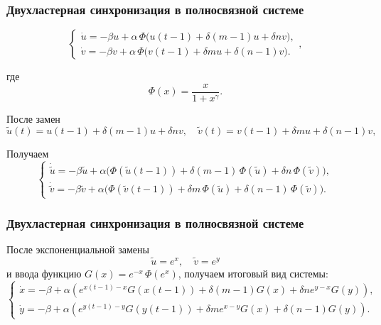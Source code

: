 \begin{frame}
	\frametitle{Двухластерная синхронизация в полносвязной системе}
	
	\begin{equation}
		\label{eq:mg_cluster_system_norm}
		\begin{cases}
			\dot{u} = -\beta u + \alpha \, \Phi \big(u(t - 1) + \delta (m - 1) u + \delta n v\big),\\
			\dot{v} = -\beta v + \alpha  \, \Phi \big(v(t - 1) + \delta m u + \delta (n - 1) v\big).
		\end{cases},
	\end{equation}
	
	где 
	\begin{equation*}
		\Phi(x) = \dfrac{x}{1 + x^\gamma}.
	\end{equation*}
	
	После замен
	\begin{equation}
		\label{eq:tilde_change}
		\tilde{u}(t) = u(t - 1) + \delta (m - 1) u + \delta n v, \quad \tilde{v}(t) = v(t - 1) + \delta m u + \delta (n - 1) v,
	\end{equation}
	
	Получаем
	\begin{equation}
		\label{eq:mg_cluster_system_tilde}
		\begin{cases}
			\dot{\tilde{u}} = -\beta \tilde{u} + \alpha \big(\Phi(\tilde{u}(t - 1)) + \delta (m - 1) \, \Phi(\tilde{u}) + \delta n \, \Phi(\tilde{v})\big),\\
			\dot{\tilde{v}} = -\beta \tilde{v} + \alpha \big(\Phi(\tilde{v}(t - 1)) + \delta m \, \Phi(\tilde{u}) + \delta (n - 1) \, \Phi(\tilde{v})\big).
		\end{cases}
	\end{equation}
\end{frame}

\begin{frame}
	\frametitle{Двухластерная синхронизация в полносвязной системе}
	
	После экспоненциальной замены
	\begin{equation}
		\label{eq:exp_change}
		\tilde{u} = e^x, \quad \tilde{v} = e^y
	\end{equation}
	и ввода функцию $G(x) = e^{-x} \, \Phi (e^x)$, получаем итоговый вид системы:
	\begin{equation}
		\label{eq:system_main}
		\begin{cases}
			\dot{x} = -\beta + \alpha \left(e^{x(t - 1) - x} G(x(t - 1)) + \delta (m - 1) G(x) + \delta n e^{y - x} G(y)\right),\\
			\dot{y} = -\beta + \alpha \left(e^{y(t - 1) - y} G(y(t - 1)) + \delta m e^{x - y} G(x) + \delta (n - 1) G(y)\right).
		\end{cases}
	\end{equation}
\end{frame}

